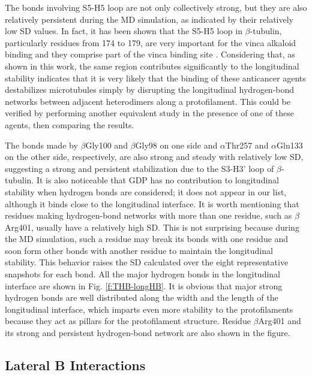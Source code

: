 \documentclass[11pt]{report}
\begin{document}
The bonds involving S5-H5 loop are not only collectively
strong, but they are also relatively persistent during the MD simulation, as indicated by their relatively low SD values. In fact, it has been shown that the S5-H5 loop in $\beta$-tubulin, particularly residues from 174 to 179, are very important for the vinca alkaloid binding and they comprise part of the vinca binding site
\cite{Gigant2005,Torin2006}. Considering that, as shown in this work, the same region contributes significantly to the longitudinal stability indicates that it is very likely that the binding of these anticancer agents destabilizes microtubules simply by disrupting the longitudinal hydrogen-bond networks between adjacent heterodimers along a protofilament. This could be verified by performing another equivalent study in the presence of one of these agents, then comparing the results.

The bonds made by $\beta$Gly100 and $\beta$Gly98 on one side and
$\alpha$Thr257 and $\alpha$Gln133 on the other side, respectively, are also strong and steady with relatively low SD, suggesting a strong and persistent stabilization due to the S3-H3' loop of $\beta$-tubulin. It is also noticeable that GDP has no contribution to longitudinal stability when hydrogen bonds are considered; it does not appear in our list, although it binds close to the longitudinal interface. It is worth mentioning that residues making hydrogen-bond networks with more than one residue, such as $\beta$Arg401, usually have a relatively high SD. This is not surprising because during the MD simulation, such a residue may break its bonds with one residue and soon form other bonds with another residue to maintain the longitudinal stability. This behavior raises the SD calculated over the eight representative snapshots for each bond. All the major hydrogen bonds in the longitudinal interface are shown in Fig.
\ref{f:THB-longHB}. 
It is obvious that major strong hydrogen bonds are well distributed along the width and the length of the longitudinal interface, which imparts even more stability to the protofilaments because they act as pillars for the protofilament structure. Residue $\beta$Arg401 and its strong and persistent hydrogen-bond network are also shown in the figure.

\subsection{Lateral B Interactions}
\label{ss:THB-Results-LatB}
\end{document}

